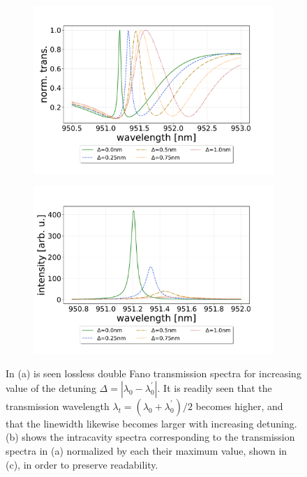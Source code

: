 \begin{figure}[h!]
    \centering
    \begin{subfigure}[b]{0.49\textwidth}
        \includegraphics[width=\textwidth]{figures/detuning_scan_double_fano_30um.pdf}
        \caption{}
        \label{fig:detuning_scan}
    \end{subfigure}
    \begin{subfigure}[b]{0.49\textwidth}
        \includegraphics[width=\textwidth]{figures/detuning_scan_double_fano_30um_intracavity.pdf}
        \caption{}
        \label{fig:detuning_scan_intracavity}
    \end{subfigure}
    \caption{In (a) is seen lossless double Fano transmission spectra for increasing value of the detuning $\Delta = |\lambda_{0} - \lambda_{0}^{\prime}|$. It is readily seen that the transmission wavelength $\lambda_t = (\lambda_{0} + \lambda_{0}^{\prime})/2$ becomes higher, and that the linewidth likewise becomes larger with increasing detuning. (b) shows the intracavity spectra corresponding to the transmission spectra in (a) normalized by each their maximum value, shown in (c), in order to preserve readability.}
    \label{fig:detuning_scans}
\end{figure}

